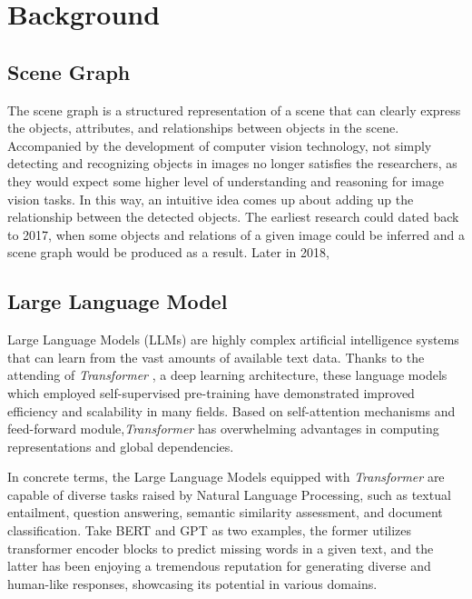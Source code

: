 

\chapter{Background}\label{chapter:background}

\section{Scene Graph}
The scene graph is a structured representation of a scene that can clearly express the objects, attributes, and relationships between objects in the scene\cite{9661322}. Accompanied by the development of computer vision technology, not simply detecting and recognizing objects in images no longer satisfies the researchers, as they would expect some higher level of understanding and reasoning for image vision tasks. In this way, an intuitive idea comes up about adding up the relationship between the detected objects. The earliest research could dated back to 2017, when some objects and relations of a given image could be inferred and a scene graph would be produced as a result\cite{xu2017scene}. Later in 2018,


\section{Large Language Model}
Large Language Models (LLMs) are highly complex artificial intelligence systems that can learn from the vast amounts of available text data\cite{radford2018improving}. Thanks to the attending of \textit{Transformer} \cite{vaswani2017attention}, a deep learning architecture, these language models which employed self-supervised pre-training have demonstrated improved efficiency and scalability in many fields.
 Based on self-attention mechanisms and feed-forward module,\textit{Transformer} has overwhelming advantages in computing representations and global dependencies.

In concrete terms, the Large Language Models equipped with \textit{Transformer} are capable of diverse tasks raised by Natural Language Processing\cite{chowdhary2020natural}, such as textual entailment, question answering, semantic similarity assessment, and document classification. Take BERT\cite{alaparthi2020bidirectional} and GPT \cite{radford2018improving,radford2019language,brown2020language} as two examples, the former utilizes transformer encoder blocks to predict missing words in a given text, and the latter has been enjoying a tremendous reputation for generating diverse and human-like responses, showcasing its potential in various domains.

